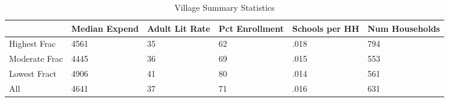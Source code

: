 \begin{table}[htbp]
\caption{\label{vsummary} Village Summary Statistics}\centering\medskip
\begin{tabular}{|l|l|l|l|l|l|}\hline  
 & Median Expend  & Adult Lit Rate  & Pct Enrollment  & Schools per HH  & Num Households  \\ \hline  
Highest Frac &      4561 &        35 &        62 &      .018 &       794 \\ \hline 
Moderate Frac &      4445 &        36 &        69 &      .015 &       553 \\ \hline 
Lowest Fract &      4906 &        41 &        80 &      .014 &       561 \\ \hline 
All &      4641 &        37 &        71 &      .016 &       631 \\ \hline 
  \end{tabular}
\end{table}
